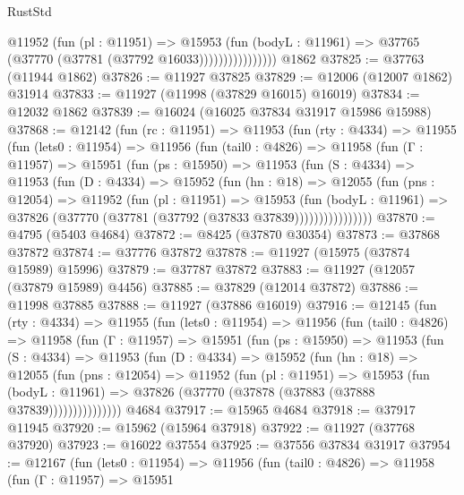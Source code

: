 \begin{lexlean}{RustStd}
\begin{coremodule}
                        @11952
                          (fun (pl : @11951) =>
                          @15953
                            (fun (bodyL : @11961) =>
                            @37765 (@37770 (@37781 (@37792 @16033))))))))))))))))
    @1862
@37825 := @37763 (@11944 @1862)
@37826 := @11927 @37825
@37829 := @12006 (@12007 @1862) @31914
@37833 := @11927 (@11998 (@37829 @16015) @16019)
@37834 := @12032 @1862
@37839 := @16024 (@16025 @37834 @31917 @15986 @15988)
@37868 := @12142
    (fun (rc : @11951) =>
    @11953
      (fun (rty : @4334) =>
      @11955
        (fun (lets0 : @11954) =>
        @11956
          (fun (tail0 : @4826) =>
          @11958
            (fun (Γ : @11957) =>
            @15951
              (fun (ps : @15950) =>
              @11953
                (fun (S : @4334) =>
                @11953
                  (fun (D : @4334) =>
                  @15952
                    (fun (hn : @18) =>
                    @12055
                      (fun (pns : @12054) =>
                      @11952
                        (fun (pl : @11951) =>
                        @15953
                          (fun (bodyL : @11961) =>
                          @37826 (@37770 (@37781 (@37792 (@37833 @37839))))))))))))))))
@37870 := @4795 (@5403 @4684)
@37872 := @8425 (@37870 @30354)
@37873 := @37868 @37872
@37874 := @37776 @37872
@37878 := @11927 (@15975 (@37874 @15989) @15996)
@37879 := @37787 @37872
@37883 := @11927 (@12057 (@37879 @15989) @4456)
@37885 := @37829 (@12014 @37872)
@37886 := @11998 @37885
@37888 := @11927 (@37886 @16019)
@37916 := @12145
    (fun (rty : @4334) =>
    @11955
      (fun (lets0 : @11954) =>
      @11956
        (fun (tail0 : @4826) =>
        @11958
          (fun (Γ : @11957) =>
          @15951
            (fun (ps : @15950) =>
            @11953
              (fun (S : @4334) =>
              @11953
                (fun (D : @4334) =>
                @15952
                  (fun (hn : @18) =>
                  @12055
                    (fun (pns : @12054) =>
                    @11952
                      (fun (pl : @11951) =>
                      @15953
                        (fun (bodyL : @11961) =>
                        @37826 (@37770 (@37878 (@37883 (@37888 @37839)))))))))))))))
    @4684
@37917 := @15965 @4684
@37918 := @37917 @11945
@37920 := @15962 (@15964 @37918)
@37922 := @11927 (@37768 @37920)
@37923 := @16022 @37554
@37925 := @37556 @37834 @31917
@37954 := @12167
    (fun (lets0 : @11954) =>
    @11956
      (fun (tail0 : @4826) =>
      @11958
        (fun (Γ : @11957) =>
        @15951

\end{coremodule}
\end{lexlean}
